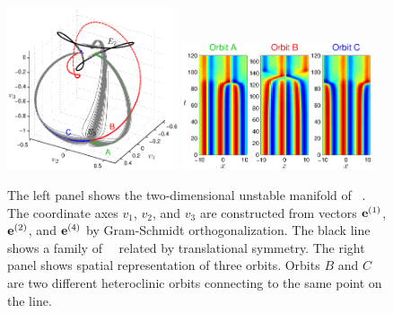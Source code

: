 \begin{figure}[t]
\begin{center}
\includegraphics[width=0.45\textwidth]{figs/ks22_E3_manifold.eps}
\includegraphics[width=0.5\textwidth]{figs/ks22_E3_orbits_c.eps}
\end{center}
\caption{
The left panel shows the two-dimensional
unstable manifold of \eqv\ . The coordinate axes
$v_1$, $v_2$, and $v_3$ are constructed from vectors
${\mathbf e}^{(1)}$, ${\mathbf e}^{(2)}$, and ${\mathbf e}^{(4)}$ by Gram-Schmidt orthogonalization.
The black line shows a family of ~\eqva\ related by translational
symmetry. The right panel shows spatial representation of
three orbits. Orbits $B$ and $C$ are two different heteroclinic orbits
connecting  to the same point on the  line.
        }
\label{f:KS22E3man}
\end{figure}

